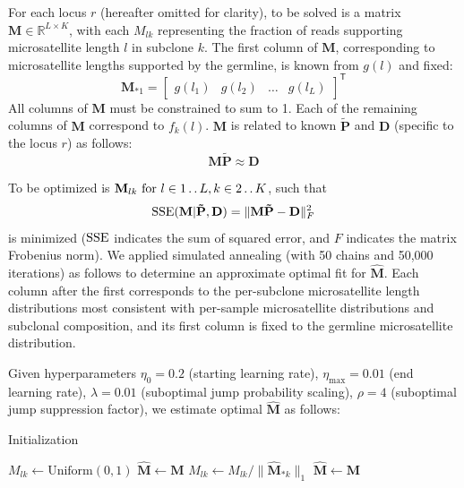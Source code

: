 For each locus $r$ (hereafter omitted for clarity), to be solved is a matrix $\mathbf{M} \in \mathbb{R}^{L \times K}$, with each $M_{lk}$ representing the fraction of reads supporting microsatellite length $l$ in subclone $k$. The first column of $\mathbf{M}$, corresponding to microsatellite lengths supported by the germline, is known from $g(l)$ and fixed:
\[
	\mathbf{M}_{*1} = \begin{bmatrix} g(l_1) & g(l_2) & \dots & g(l_L) \end{bmatrix}^{\mathsf{T}}
\]
All columns of $\mathbf{M}$ must be constrained to sum to 1. Each of the remaining columns of $\mathbf{M}$ correspond to $f_k(l)$. $\mathbf{M}$ is related to known $\mathbf{\tilde{P}}$ and $\mathbf{D}$ (specific to the locus $r$) as follows:
\begin{equation}
\mathbf{M} \mathbf{\tilde{P}} \approx \mathbf{D}
\end{equation}

To be optimized is $\mathbf{M}_{lk} \text{ for } l \in 1 \mathinner {\ldotp \ldotp} L, k \in 2 \mathinner {\ldotp \ldotp} K$, such that
\begin{equation}
\operatorname{SSE}(\mathbf{M} | \mathbf{\tilde{P}}, \mathbf{D}) = \lVert \mathbf{M} \mathbf{\tilde{P}} - \mathbf{D} \rVert^2_F
\end{equation}
is minimized ($\operatorname{SSE}$ indicates the sum of squared error, and $\scriptstyle{F}$ indicates the matrix Frobenius norm). We applied simulated annealing \cite{metropolis53,kirkpatrick83} (with 50 chains and 50,000 iterations) as follows to determine an approximate optimal fit for $\hat{\mathbf{M}}$. Each column after the first corresponds to the per-subclone microsatellite length distributions most consistent with per-sample microsatellite distributions and subclonal composition, and its first column is fixed to the germline microsatellite distribution.

Given hyperparameters $\eta_0 = 0.2$ (starting learning rate), $\eta_\text{max} = 0.01$ (end learning rate), $\lambda = 0.01$ (suboptimal jump probability scaling), $\rho = 4$ (suboptimal jump suppression factor), we estimate optimal $\hat{\mathbf{M}}$ as follows:
\begin{algorithm}[H]
	\caption{Initialization}
	\label{alg:msiclones:mh-init}
	\begin{algorithmic}[1]
			\State $M_{lk} \gets \text{Uniform}(0, 1)$
		\EndFor
	\EndFor
	\State $\hat{\mathbf{M}} \gets \mathbf{M}$
			\State $M_{lk} \gets M_{lk} / \lVert \hat{\mathbf{M}}_{*k} \rVert_1$
		\EndFor
	\EndFor
	\State $\hat{\mathbf{M}} \gets \mathbf{M}$
	\end{algorithmic}
\end{algorithm}

